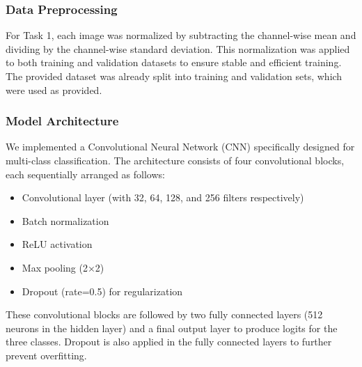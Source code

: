 \documentclass[11pt,a4paper]{article}
\begin{document}
\subsubsection{Data Preprocessing}
For Task 1, each image was normalized by subtracting the channel-wise mean and dividing by the channel-wise standard deviation. This normalization was applied to both training and validation datasets to ensure stable and efficient training. The provided dataset was already split into training and validation sets, which were used as provided.

\subsubsection{Model Architecture}
We implemented a Convolutional Neural Network (CNN) specifically designed for multi-class classification. The architecture consists of four convolutional blocks, each sequentially arranged as follows:

\begin{itemize}
    \item Convolutional layer (with 32, 64, 128, and 256 filters respectively)
    \item Batch normalization
    \item ReLU activation
    \item Max pooling (2×2)
    \item Dropout (rate=0.5) for regularization
\end{itemize}

These convolutional blocks are followed by two fully connected layers (512 neurons in the hidden layer) and a final output layer to produce logits for the three classes. Dropout is also applied in the fully connected layers to further prevent overfitting.
\end{document}

